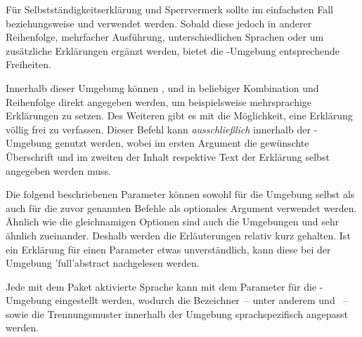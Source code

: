 \begin{DeclareEntity*}{}
\begin{DeclareEntity*}{}
\begin{DeclareEntity*}{}
\begin{Declaration}
\begin{Declaration}
\begin{Declaration}
\begin{Declaration}
\begin{Declaration}
\begin{Declaration}
\begin{Declaration}
\begin{Declaration}
\begin{Declaration}
\begin{Declaration}
\begin{Declaration}
Für Selbstständigkeitserklärung und Sperrvermerk sollte im einfachsten Fall 
 beziehungsweise  und  
verwendet werden. Sobald diese jedoch in anderer Reihenfolge, mehrfacher 
Ausführung, unterschiedlichen Sprachen oder um zusätzliche Erklärungen ergänzt 
werden, bietet die -Umgebung entsprechende 
Freiheiten.

Innerhalb dieser Umgebung können ,  und 
 in beliebiger Kombination und Reihenfolge direkt angegeben 
werden, um beispielsweise mehrsprachige Erklärungen zu setzen.
%
Des Weiteren gibt es mit  die 
Möglichkeit, eine Erklärung völlig frei zu verfassen. Dieser Befehl kann 
\emph{ausschließlich} innerhalb der -Umgebung 
genutzt werden, wobei im ersten Argument die gewünschte Überschrift und im 
zweiten der Inhalt respektive Text der Erklärung selbst angegeben werden muss.

Die folgend beschriebenen Parameter können sowohl für die Umgebung 
 selbst als auch für die zuvor genannten Befehle als 
optionales Argument verwendet werden. Ähnlich wie die gleichnamigen Optionen 
sind auch die Umgebungen  und  
sehr ähnlich zueinander. Deshalb werden die Erläuterungen relativ kurz 
gehalten. Ist ein Erklärung für einen Parameter etwas unverständlich, kann 
diese bei der Umgebung \Environment'full'{abstract} nachgelesen werden.

%
Jede mit dem Paket  aktivierte Sprache kann mit dem Parameter 
 für die 
-Umgebung eingestellt werden, wodurch die 
Bezeichner~-- unter anderem  und ~-- 
sowie die Trennungsmuster innerhalb der Umgebung sprachspezifisch angepasst 
werden. 


\end{Declaration}
\end{Declaration}
\end{Declaration}
\end{Declaration}
\end{Declaration}
\end{Declaration}
\end{Declaration}
\end{Declaration}
\end{Declaration}
\end{Declaration}
\end{Declaration}
\end{DeclareEntity*}
\end{DeclareEntity*}
\end{DeclareEntity*}
